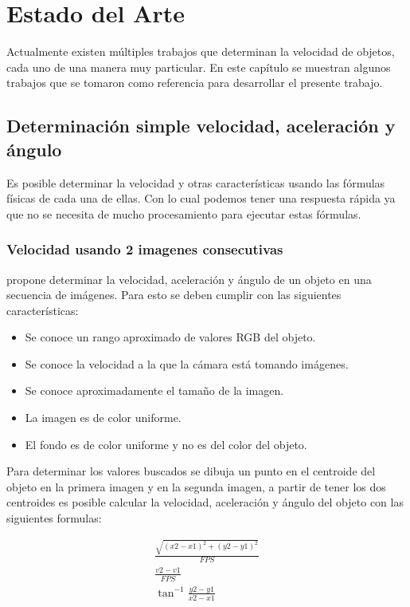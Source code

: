 \chapter{Estado del Arte}

Actualmente existen múltiples trabajos que determinan la velocidad de objetos, cada uno de una manera muy particular. En este capítulo se muestran algunos trabajos que se tomaron como referencia para desarrollar el presente trabajo.

\section{Determinación simple velocidad, aceleración y ángulo}

Es posible determinar la velocidad y otras características usando las fórmulas físicas de cada una de ellas. Con lo cual podemos tener una respuesta rápida ya que no se necesita de mucho procesamiento para ejecutar estas fórmulas.

\subsection{Velocidad usando 2 imagenes consecutivas}

\cite{singh2007Estimating} propone determinar la velocidad, aceleración y ángulo de un objeto en  una secuencia de imágenes. Para esto se deben cumplir con las siguientes características:

\begin{itemize}
\item Se conoce un rango aproximado de valores RGB del objeto.
\item Se conoce la velocidad a la que la cámara está tomando imágenes.
\item Se conoce aproximadamente el tamaño de la imagen.
\item La imagen es de color uniforme.
\item El fondo es de color uniforme y no es del color del objeto.
\end{itemize}

Para determinar los valores buscados se dibuja un punto en el centroide del objeto en la primera imagen y en la segunda imagen, a partir de tener los dos centroides es posible calcular la velocidad, aceleración y ángulo del objeto con las siguientes formulas:

\begin{eqnarray}
    \frac{
        \sqrt{
            (x2-x1)^{2} + (y2-y1)^{2}
        }
    }{
        FPS
    }\\
    \frac{
        v2-v1
    }{
        FPS
    }\\
    \tan^{-1}\frac{y2-y1}{x2-x1}
\end{eqnarray}

